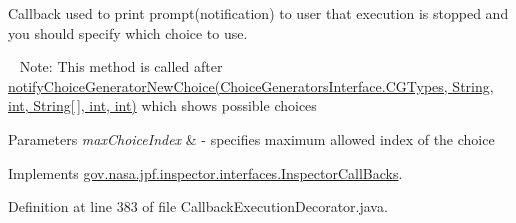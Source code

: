 Callback used to print prompt(notification) to user that execution is stopped and you should specify which choice to use. 

~\newline
Note\+: This method is called after \hyperlink{}{notify\+Choice\+Generator\+New\+Choice(\+Choice\+Generators\+Interface.\+C\+G\+Types, String, int, String\mbox{[}$\,$\mbox{]}, int, int)} which shows possible choices


\begin{DoxyParams}{Parameters}
{\em max\+Choice\+Index} & -\/ specifies maximum allowed index of the choice \\
\hline
\end{DoxyParams}


Implements \hyperlink{interfacegov_1_1nasa_1_1jpf_1_1inspector_1_1interfaces_1_1_inspector_call_backs_a95bd37f4f3ad147514c86fa77856b51d}{gov.\+nasa.\+jpf.\+inspector.\+interfaces.\+Inspector\+Call\+Backs}.



Definition at line 383 of file Callback\+Execution\+Decorator.\+java.


